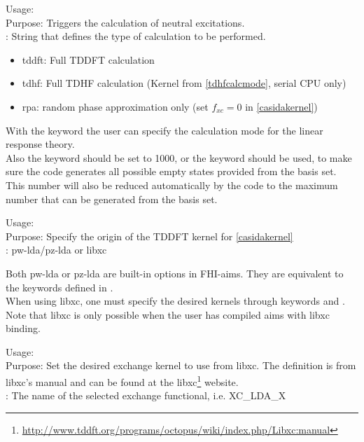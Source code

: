  {
\noindent
Usage:  \\
Purpose: Triggers the calculation of neutral excitations.\\
: String that defines the type of calculation to be performed.
\begin{itemize}
\item tddft: Full TDDFT calculation
\item tdhf: Full TDHF calculation (Kernel from \ref{tdhfcalcmode}, serial CPU only)
\item rpa: random phase approximation only (set $f_{xc}=0$ in \ref{casidakernel})\\
\end{itemize}
}
With the keyword  the user can specify the calculation mode for the linear response theory.\\
Also the keyword  should be set to 1000, or the keyword  should be used, to make sure the code generates all
possible empty states provided from the basis set. This number will also be reduced automatically by the code to the maximum number that can be generated from the basis set.

 {
\noindent
Usage:  \\
Purpose: Specify the origin of the TDDFT kernel for \ref{casidakernel}\\
: pw-lda/pz-lda or libxc

Both pw-lda or pz-lda are built-in options in FHI-aims. They are equivalent to the keywords defined in .\\
When using libxc, one must specify the desired kernels through keywords  and . Note that libxc is only possible when the user has compiled aims with libxc binding.
}

 {
\noindent
Usage:  \\
Purpose: Set the desired exchange kernel to use from libxc. The definition is from libxc's manual and can be found at the 
libxc\footnote{\url{http://www.tddft.org/programs/octopus/wiki/index.php/Libxc:manual}} website.\\
: The name of the selected exchange functional, i.e. XC\_LDA\_X
}

